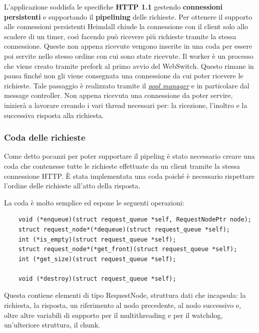\documentclass[italian]{tktltiki2}
\begin{document}
L'applicazione soddisfa le specifiche \textbf{HTTP 1.1} gestendo \textbf{connessioni persistenti} e supportando il \textbf{pipelining} delle richieste. Per ottenere il supporto alle connessioni persistenti Heimdall chiude la connessione con il client solo allo scadere di un timer, così facendo può ricevere più richieste tramite la stessa connessione. Queste non appena ricevute vengono inserite in una coda per essere poi servite nello stesso ordine con cui sono state ricevute.
Il worker è un processo che viene creato tramite prefork al primo avvio del WebSwitch. Questo rimane in pausa finché non gli viene consegnata una connessione da cui poter ricevere le richieste. Tale passaggio è realizzato tramite il \hyperref[sec:pool]{\emph{pool manager}} e in particolare dal message controller. Non appena ricevuta una connessione da poter servire, inizierà a lavorare creando i vari thread necessari per: la ricezione, l'inoltro e la successiva risposta alla richiesta.

\subsubsection*{Coda delle richieste}
\label{sec:requests_queue}

Come detto pocanzi per poter supportare il pipeling è stato necessario creare una coda che contenesse tutte le richieste effettuate da un client tramite la stessa connessione HTTP. È stata implementata una coda poiché è necessario rispettare l'ordine delle richieste all'atto della risposta. 

La coda è molto semplice ed espone le seguenti operazioni:
\begin{lstlisting}
    void (*enqueue)(struct request_queue *self, RequestNodePtr node);
    struct request_node*(*dequeue)(struct request_queue *self);
    int (*is_empty)(struct request_queue *self);
    struct request_node*(*get_front)(struct request_queue *self);
    int (*get_size)(struct request_queue *self);

    void (*destroy)(struct request_queue *self);
\end{lstlisting}

Questa contiene elementi di tipo RequestNode, struttura dati che incapsula: la richiesta, la risposta, un riferimento al nodo precedente, al nodo successivo e, oltre altre variabili di supporto per il multithreading e per il watchdog, un'ulteriore struttura, il chunk.
\end{document}
